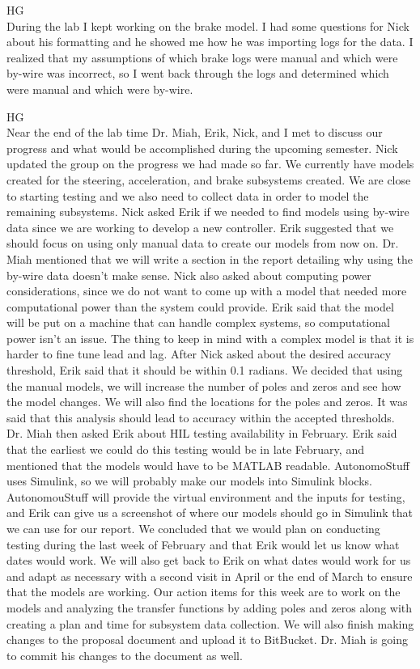 \documentclass[fontsize=11pt, %
                             paper=letter, %
                             openany, %
                             captions=tableheading,
                             index=totoc,
                             hyperref]{labbook}
\begin{document}
\begin{addmargin}[0cm]{0cm}
HG\\
During the lab I kept working on the brake model. I had some questions for Nick about his formatting and he showed me how he was importing logs for the data. I realized that my assumptions of which brake logs were manual and which were by-wire was incorrect, so I went back through the logs and determined which were manual and which were by-wire. 

HG\\
Near the end of the lab time Dr. Miah, Erik, Nick, and I met to discuss our progress and what would be accomplished during the upcoming semester. Nick updated the group on the progress we had made so far. We currently have models created for the steering, acceleration, and brake subsystems created. We are close to starting testing and we also need to collect data in order to model the remaining subsystems. Nick asked Erik if we needed to find models using by-wire data since we are working to develop a new controller. Erik suggested that we should focus on using only manual data to create our models from now on. Dr. Miah mentioned that we will write a section in the report detailing why using the by-wire data doesn't make sense. Nick also asked about computing power considerations, since we do not want to come up with a model that needed more computational power than the system could provide. Erik said that the model will be put on a machine that can handle complex systems, so computational power isn't an issue. The thing to keep in mind with a complex model is that it is harder to fine tune lead and lag. After Nick asked about the desired accuracy threshold, Erik said that it should be within 0.1 radians. We decided that using the manual models, we will increase the number of poles and zeros and see how the model changes. We will also find the locations for the poles and zeros. It was said that this analysis should lead to accuracy within the accepted thresholds. Dr. Miah then asked Erik about HIL testing availability in February. Erik said that the earliest we could do this testing would be in late February, and mentioned that the models would have to be MATLAB readable. AutonomoStuff uses Simulink, so we will probably make our models into Simulink blocks. AutonomouStuff will provide the virtual environment and the inputs for testing, and Erik can give us a screenshot of where our models should go in Simulink that we can use for our report. We concluded that we would plan on conducting testing during the last week of February and that Erik would let us know what dates would work. We will also get back to Erik on what dates would work for us and adapt as necessary with a second visit in April or the end of March to ensure that the models are working. Our action items for this week are to work on the models and analyzing the transfer functions by adding poles and zeros along with creating a plan and time for subsystem data collection. We will also finish making changes to the proposal document and upload it to BitBucket. Dr. Miah is going to commit his changes to the document as well. 



\end{addmargin}
\end{document}

